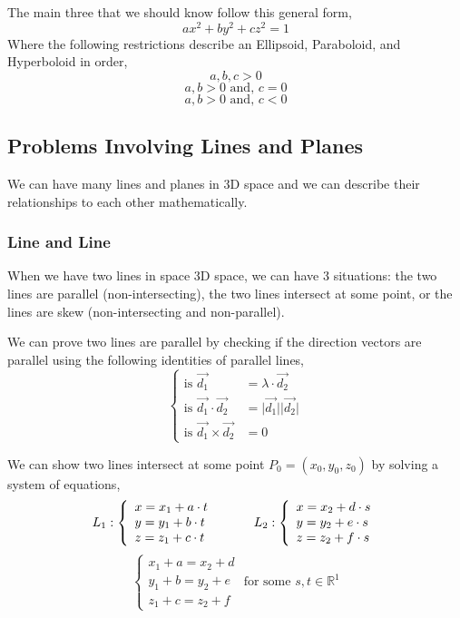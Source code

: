 \documentclass{article}
\begin{document}
The main three that we should know follow this general form, 
$$ax^2 + by^2 + cz^2 = 1$$
Where the following restrictions describe an Ellipsoid, Paraboloid, and Hyperboloid in order,
$$a,b,c > 0$$
$$a,b > 0 \text{ and, } c = 0$$
$$a,b > 0 \text{ and, } c < 0$$




\subsection{Problems Involving Lines and Planes}
We can have many lines and planes in 3D space and we can describe their relationships to each other mathematically. 

\subsubsection{Line and Line}
When we have two lines in space 3D space, we can have 3 situations: the two lines are parallel (non-intersecting), the two lines intersect at some point, or the lines are skew (non-intersecting and non-parallel).

We can prove two lines are parallel by checking if the direction vectors are parallel using the following identities of parallel lines,
$$\left\{\begin{array}{lr}
\text{is } \vec{d_1} &= \lambda \cdot \vec{d_2}\\
\text{is } \vec{d_1} \cdot \vec{d_2} &= \lvert\vec{d_1}\rvert\lvert\vec{d_2}\rvert \\
\text{is } \vec{d_1} \times \vec{d_2} &= 0
\end{array}
\right.$$

We can show two lines intersect at some point $P_0 = (x_0,y_0,z_0)$ by solving a system of equations,
$$ L_1: 
\left\{ \begin{array}{lr}
x = x_1 + a \cdot t \\
y = y_1 + b \cdot t \\
z = z_1 + c \cdot t
\end{array} \right.
\hspace{1 cm} L_2: 
\left\{ \begin{array}{lr}
x = x_2 + d \cdot s \\
y = y_2 + e \cdot s \\
z = z_2 + f \cdot s 
\end{array} \right. $$
$$\left\{ \begin{array}{lr}
x_1 + a = x_2 + d \\
y_1 + b = y_2 + e \\
z_1 + c = z_2 + f
\end{array} \right.
\text{ for some } s,t \in \mathbb{R}^1$$
\end{document}
